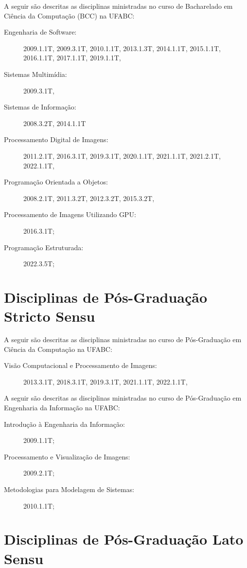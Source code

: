 A seguir são descritas as disciplinas ministradas no curso de  Bacharelado em Ciência da Computação (BCC) na UFABC:
\begin{description}
    \item [Engenharia de Software:] 2009.1.1T, 2009.3.1T, 2010.1.1T, 2013.1.3T, 2014.1.1T, 2015.1.1T, 2016.1.1T, 2017.1.1T, 2019.1.1T, 
    \item [Sistemas Multimídia:] 2009.3.1T, 
    \item [Sistemas de Informação:] 2008.3.2T, 2014.1.1T
    \item [Processamento Digital de Imagens:] 2011.2.1T, 2016.3.1T, 2019.3.1T, 2020.1.1T, 2021.1.1T, 2021.2.1T, 2022.1.1T,  
    \item [Programação Orientada a Objetos:] 2008.2.1T, 2011.3.2T, 2012.3.2T, 2015.3.2T, 
    \item [Processamento de Imagens Utilizando GPU:] 2016.3.1T;
    \item [Programação Estruturada:] 2022.3.5T;
\end{description}

\section{Disciplinas de Pós-Graduação Stricto Sensu}

A seguir são descritas as disciplinas ministradas no curso de Pós-Graduação em Ciência da Computação na UFABC:

\begin{description}
    \item [Visão Computacional e Processamento de Imagens:] 2013.3.1T, 2018.3.1T, 2019.3.1T, 2021.1.1T, 2022.1.1T, 
\end{description}

A seguir são descritas as disciplinas ministradas no curso de Pós-Graduação em Engenharia da Informação na UFABC:
\begin{description}
    \item[Introdução à Engenharia da Informação:] 2009.1.1T;
    \item[Processamento e Visualização de Imagens:] 2009.2.1T;
    \item[Metodologias para Modelagem de Sistemas:] 2010.1.1T;
\end{description}

\section{Disciplinas de Pós-Graduação Lato Sensu}

